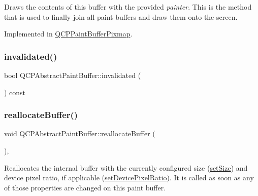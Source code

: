 Draws the contents of this buffer with the provided {\itshape painter}. This is the method that is used to finally join all paint buffers and draw them onto the screen. 

Implemented in \mbox{\hyperlink{class_q_c_p_paint_buffer_pixmap_af7bfc685e56a0a9329e57cd9a265eb74}{Q\+C\+P\+Paint\+Buffer\+Pixmap}}.

\mbox{\label{class_q_c_p_abstract_paint_buffer_a76bf771cda945a6c602cf9b7d365d92b}} 
\subsubsection{\texorpdfstring{invalidated()}{invalidated()}}
{\footnotesize\ttfamily bool Q\+C\+P\+Abstract\+Paint\+Buffer\+::invalidated (\begin{DoxyParamCaption}{ }\end{DoxyParamCaption}) const\hspace{0.3cm}{\ttfamily [inline]}}

\mbox{\label{class_q_c_p_abstract_paint_buffer_aee7506a52bd7e5a07c2af27935eb13e7}} 
\subsubsection{\texorpdfstring{reallocateBuffer()}{reallocateBuffer()}}
{\footnotesize\ttfamily void Q\+C\+P\+Abstract\+Paint\+Buffer\+::reallocate\+Buffer (\begin{DoxyParamCaption}{ }\end{DoxyParamCaption})\hspace{0.3cm}{\ttfamily [protected]}, {}}

Reallocates the internal buffer with the currently configured size (\mbox{\hyperlink{class_q_c_p_abstract_paint_buffer_a8b68c3cd36533f1a4a23b5ce8cd66f01}{set\+Size}}) and device pixel ratio, if applicable (\mbox{\hyperlink{class_q_c_p_abstract_paint_buffer_a555eaad5d5c806420ff35602a1bb68fa}{set\+Device\+Pixel\+Ratio}}). It is called as soon as any of those properties are changed on this paint buffer.

